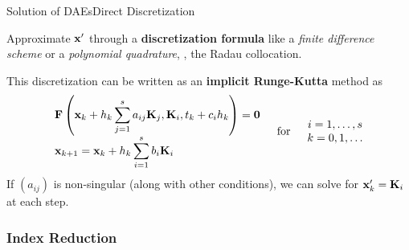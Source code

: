 \begin{frame}{Solution of \aclp{DAE}}{Direct Discretization}
  \begin{bbox}
    Approximate $\mathbf{x}^\prime$ through a \textbf{discretization formula} like a \emph{finite difference scheme} or a \emph{polynomial quadrature}, \eg{}, the Radau collocation.
  \end{bbox}
  \vspace{0.5em}
  This discretization can be written as an \textbf{implicit Runge-Kutta} method as
  \begin{equation*}
    \begin{array}{l}
      \mathbf{F}\left(\mathbf{x}_{k} + h_k\displaystyle\sum_{j=1}^{s}a_{ij} \mathbf{K}_j, \mathbf{K}_i, t_{k} + c_i h_k\right) = \mathbf{0} \\[0.5em]
      \mathbf{x}_{k+1} = \mathbf{x}_{k} + h_k\displaystyle\sum_{i=1}^{s} b_i \mathbf{K}_i
    \end{array}
    \quad \text{for} \quad
    \begin{array}{c}
      i = 1, \dots, s \\
      k = 0, 1, \dots
    \end{array}
  \end{equation*}
  If $(a_{ij})$ is non-singular (along with other conditions), we can solve for $\mathbf{x}^\prime_k = \mathbf{K}_i$ at each step.
\end{frame}

\subsubsection{Index Reduction}

